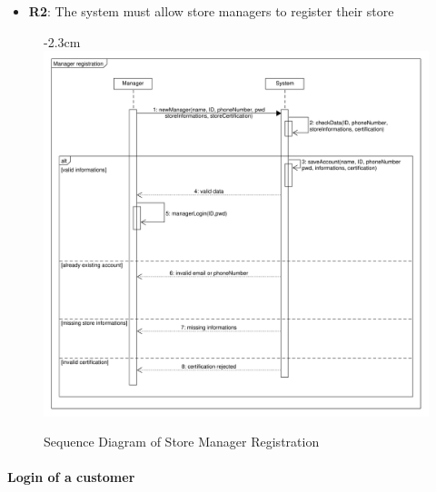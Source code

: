 \documentclass{article}
\begin{document}
\begin{center}
\begin{adjustwidth}{-2.8cm}{}
\begin{tabular}[h!]{|m{7.5em}|m{36em}|}
					\end{tabular}
					\end{adjustwidth}
					
					\begin{itemize}
					\bigskip
					\bigskip
					\bigskip
					 {\bfseries Required functional requirements: }
					\item {\bfseries R2}: The system must allow store managers to register their store

					\end{itemize}
				
							\begin{figure}
								\begin{adjustwidth} {-2.3cm}{}
									\centering
									\includegraphics[scale=0.5]{SD/2_storeManagerRegistration.pdf}\\
									\caption{Sequence Diagram of Store Manager Registration}
								\end{adjustwidth}
							\end{figure}

				\end{center}

			\newpage
			
			\paragraph{Login of a customer}
			
\end{document}
